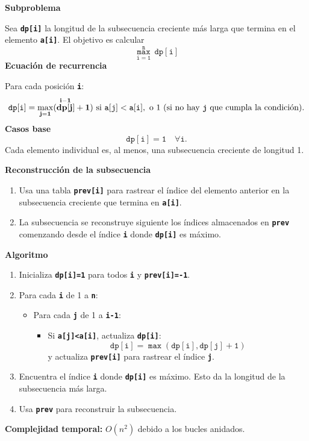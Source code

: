 \begin{enumerate}[label=\color{red}\textbf{\arabic*)}]
    \textbf{Subproblema}

    Sea \textbf{\texttt{dp[i]}} la longitud de la subsecuencia creciente más larga que termina en el elemento \textbf{\texttt{a[i]}}. El objetivo es calcular \[
        \mathbf{\mathtt{\overset{n}{\underset{i=1 }{\max } }\, dp[i]}}
    \] 
    \textbf{Ecuación de recurrencia}

    Para cada posición \textbf{\texttt{i}}:
    \[
        \mathbf{\mathtt{dp[i]}=\overset{i-1}{\underset{j=1 }{\max }(dp[j] + 1) }}\text{ si }\mathbf{\mathtt{a[j]<a[i]}},\text{ o $1$ (si no hay \textbf{\texttt{j}} que cumpla la condición).}
    \] 
    \textbf{Casos base}
    \[
        \mathbf{\mathtt{dp[i]=1\quad \forall i.}}
    \] 
    Cada elemento individual es, al menos, una subsecuencia creciente de longitud 1.

    \textbf{Reconstrucción de la subsecuencia}
    \begin{enumerate}[label=\arabic*)]
        \item Usa una tabla \textbf{\texttt{prev[i]}} para rastrear el índice del elemento anterior en la subsecuencia creciente que termina en \textbf{\texttt{a[i]}}.
        \item La subsecuencia se reconstruye siguiente los índices almacenados en \textbf{\texttt{prev}} comenzando desde el índice \textbf{\texttt{i}} donde \textbf{\texttt{dp[i]}} es máximo.
    \end{enumerate}
    \textbf{Algoritmo}
    \begin{enumerate}[label=\arabic*)]
        \item Inicializa \textbf{\texttt{dp[i]=1}} para todos \textbf{\texttt{i}} y \textbf{\texttt{prev[i]=-1}}.
        \item Para cada \textbf{\texttt{i}} de 1 a \textbf{\texttt{n}}: 
            \begin{itemize}[label=\textbullet]
                \item Para cada \textbf{\texttt{j}} de 1 a \textbf{\texttt{i-1}}:
                    \begin{itemize}[label=\textbullet]
                        \item Si \textbf{\texttt{a[j]<a[i]}}, actualiza \textbf{\texttt{dp[i]}}: \[
                                \mathbf{\mathtt{dp[i]=\max(dp[i], dp[j] + 1)}}
                            \] y actualiza \textbf{\texttt{prev[i]}} para rastrear el índice \textbf{\texttt{j}}.
                    \end{itemize}
            \end{itemize}
        \item Encuentra el índice \textbf{\texttt{i}} donde \textbf{\texttt{dp[i]}} es máximo. Esto da la longitud de la subsecuencia más larga.
        \item Usa \textbf{\texttt{prev}} para reconstruir la subsecuencia.
    \end{enumerate}
    \textbf{Complejidad temporal:} $O(n^2)$ debido a los bucles anidados.


\end{enumerate}
